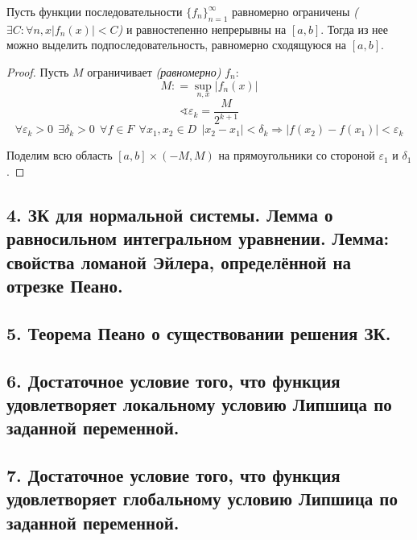 \begin{lemma}
    Пусть функции последовательности \(\{f_n\}_{n = 1}^{\infty}\) равномерно ограничены \textit{(\(\exists C : \forall n, x |f_n(x)| < C\))} и равностепенно непрерывны на \([a, b]\). Тогда из нее можно выделить подпоследовательность, равномерно сходящуюся на \([a, b]\).
\end{lemma}
\begin{proof}
    Пусть \(M\) ограничивает \textit{(равномерно)} \(f_n\):
    \[M : = \sup_{n, x} |f_n(x)|\]
    \[\sphericalangle \varepsilon_k = \frac{M}{2^{k + 1}}\]
    \[\forall \varepsilon_k > 0 \ \ \exists \delta_k > 0 \ \ \forall f\in F \ \ \forall x_1, x_2\in D \ \ |x_2 - x_1|< \delta_k \Rightarrow |f(x_2) - f(x_1)|< \varepsilon_k\]

    Поделим всю область \([a, b] \times ( - M, M)\) на прямоугольники со стороной \(\varepsilon_1\) и \(\delta_1\).

\end{proof}

\subsection*{4. ЗК для нормальной системы. Лемма о равносильном интегральном уравнении. Лемма: свойства ломаной Эйлера, определённой на отрезке Пеано.}

\subsection*{5. Теорема Пеано о существовании решения ЗК.}

\subsection*{6. Достаточное условие того, что функция удовлетворяет локальному условию Липшица по заданной переменной.}

\subsection*{7. Достаточное условие того, что функция удовлетворяет глобальному условию Липшица по заданной переменной.}


